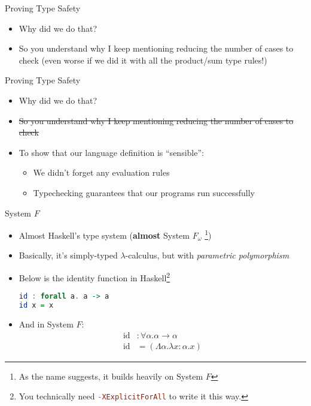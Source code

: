 \documentclass[leqno,presentation,usenames,dvipsnames]{beamer}
\begin{document}
\begin{frame}{Proving Type Safety}
    \begin{itemize}
        \item Why did we do that?
        \item So you understand why I keep mentioning reducing the number of cases to check (even worse if we did it with all the product/sum type rules!)
    \end{itemize}
\end{frame}

\begin{frame}{Proving Type Safety}
    \begin{itemize}
        \item Why did we do that?
        \item \st{So you understand why I keep mentioning reducing the number of cases to check}
        \item To show that our language definition is ``sensible'':
            \begin{itemize}
                \item We didn't forget any evaluation rules
                \item Typechecking guarantees that our programs run successfully
            \end{itemize}
    \end{itemize}
\end{frame}

\begin{frame}[fragile]{System $F$}
    \begin{itemize}
        \item Almost Haskell's type system (\textbf{almost} System $F_\omega$ \footnote{As the name suggests, it builds heavily on System $F$})
        \item Basically, it's simply-typed $\lambda$-calculus, but with \emph{parametric polymorphism}
        \item Below is the identity function in Haskell\footnote{You technically need \lstinline[language=haskell, basicstyle=\small\ttfamily]{-XExplicitForAll} to write it this way.}
\begin{lstlisting}[language=haskell, basicstyle=\small\ttfamily]
id : forall a. a -> a
id x = x
\end{lstlisting}
        \item And in System $F$:
        \begin{align*}
            \text{id} &: \forall \alpha. \alpha \to \alpha \\
            \text{id} &= (\Lambda \alpha. \lambda x : \alpha. x)
        \end{align*}
    \end{itemize}
\end{frame}
\end{document}
